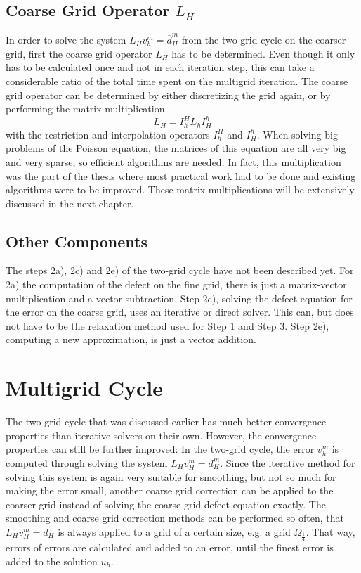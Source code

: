 \subsection{Coarse Grid Operator $L_H$}
In order to solve the system $L_H v_h^m = \overline{d}_H^m$ from the two-grid cycle on the coarser grid, first the coarse grid operator $L_H$ has to be determined. Even though it only has to be calculated once and not in each iteration step, this can take a considerable ratio of the total time spent on the multigrid iteration. The coarse grid operator can be determined by either discretizing the grid again, or by performing the matrix multiplication
\begin{equation}
L_H = I_h^H L_h I_H^h
\end{equation}
with the restriction and interpolation operators $I_h^H$ and $I_H^h$. When solving big problems of the Poisson equation, the matrices of this equation are all very big and very sparse, so efficient algorithms are needed. In fact, this multiplication was the part of the thesis where most practical work had to be done and existing algorithms were to be improved. These matrix multiplications will be extensively discussed in the next chapter. 

\subsection{Other Components}
The steps 2a), 2c) and 2e) of the two-grid cycle have not been described yet. For 2a) the computation of the defect on the fine grid, there is just a matrix-vector multiplication and a  vector subtraction. Step 2c), solving the defect equation for the error on the coarse grid, uses an iterative or direct solver. This  can, but does not have to be the relaxation method used for Step 1 and Step 3. Step 2e), computing a new approximation, is just a vector addition. 

\section{Multigrid Cycle}
\label{sec:multigrid_cycle}
The two-grid cycle that was discussed earlier has much better convergence properties than iterative solvers on their own. However, the convergence properties can still be further improved: In the two-grid cycle, the error $v_h^m$ is computed through solving the system $L_H v_H^m = d_H^m$. Since the iterative method for solving this system is again very suitable for smoothing, but not so much for making the error small, another coarse grid correction can be applied to the coarser grid instead of solving the coarse grid defect equation exactly.  The smoothing and coarse grid correction methods can be performed so often, that $L_H v_H^m = d_H$ is always applied to a grid of a certain size, e.g. a grid $\Omega_{\frac{1}{4}}$. That way, errors of errors are calculated and added to an error, until the finest error is added to the solution $u_h$. 

